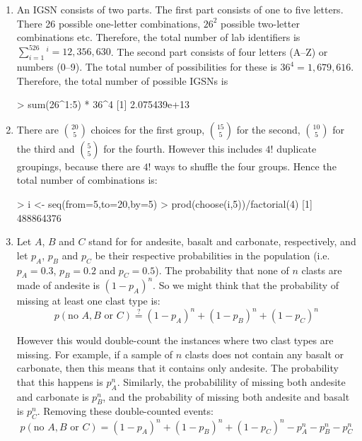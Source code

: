 \begin{enumerate}
  
\item An IGSN consists of two parts. The first part consists of one to
  five letters.  There 26 possible one-letter combinations, $26^2$
  possible two-letter combinations etc. Therefore, the total number of
  lab identifiers is $\sum_{i=1}^526^i=12,356,630$. The second part
  consists of four letters (A--Z) or numbers (0--9). The total number
  of possibilities for these is $36^4=1,679,616$. Therefore, the total
  number of possible IGSNs is

\begin{console}
> sum(26^{1:5}) * 36^4
[1] 2.075439e+13
\end{console}

\item There are $\binom{20}{5}$ choices for the first group,
  $\binom{15}{5}$ for the second, $\binom{10}{5}$ for the third and
  $\binom{5}{5}$ for the fourth. However this includes $4!$ duplicate
  groupings, because there are $4!$ ways to shuffle the four
  groups. Hence the total number of combinations is:

\begin{console}
> i <- seq(from=5,to=20,by=5)
> prod(choose(i,5))/factorial(4)
[1] 488864376
\end{console}

\item Let $A$, $B$ and $C$ stand for for andesite, basalt and
  carbonate, respectively, and let $p_A$, $p_B$ and $p_C$ be their
  respective probabilities in the population (i.e. $p_A=0.3$,
  $p_B=0.2$ and $p_C=0.5$). The probability that none of $n$ clasts
  are made of andesite is $(1-p_A)^n$. So we might think that the
  probability of missing at least one clast type is:
  \[
  p(\mbox{no~}A, B \mbox{~or~}C) \overset{?}{=}
  (1-p_A)^n + (1-p_B)^n + (1-p_C)^n
  \]
  
  However this would double-count the instances where two clast types
  are missing. For example, if a sample of $n$ clasts does not contain
  any basalt or carbonate, then this means that it contains only
  andesite.  The probability that this happens is $p_A^n$. Similarly,
  the probabilility of missing both andesite and carbonate is $p_B^n$,
  and the probability of missing both andesite and basalt is $p_C^n$.
  Removing these double-counted events:
  \[
  p(\mbox{no~}A, B \mbox{~or~}C) =
  (1-p_A)^n + (1-p_B)^n + (1-p_C)^n - p_A^n - p_B^n - p_C^n
  \]


\end{enumerate}
